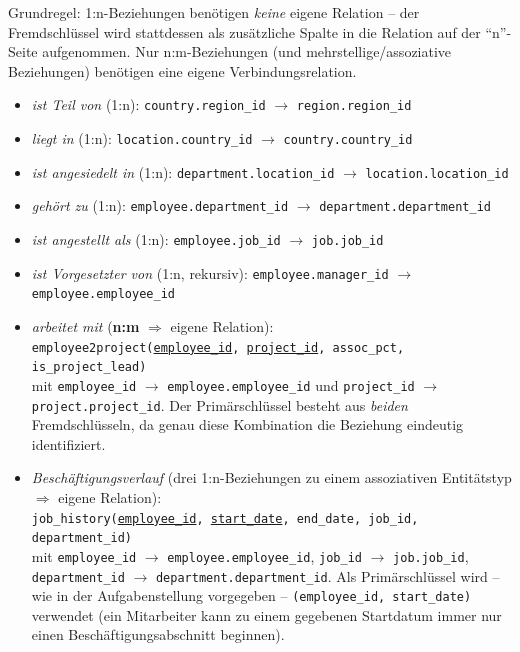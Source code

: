 \documentclass[11pt,a4paper]{article}
\newcommand{\pk}[1]{\underline{#1}}
\begin{document}
\begin{loesung}
Grundregel: 1:n-Beziehungen ben\"otigen \emph{keine} eigene Relation -- der Fremdschl\"ussel wird stattdessen als zus\"atzliche Spalte in die Relation auf der ``n''-Seite aufgenommen. Nur n:m-Beziehungen (und mehrstellige/assoziative Beziehungen) ben\"otigen eine eigene Verbindungsrelation.

\begin{itemize}
\item \emph{ist Teil von} (1:n): \texttt{country.region\_id} $\to$ \texttt{region.region\_id}
\item \emph{liegt in} (1:n): \texttt{location.country\_id} $\to$ \texttt{country.country\_id}
\item \emph{ist angesiedelt in} (1:n): \texttt{department.location\_id} $\to$ \texttt{location.location\_id}
\item \emph{geh\"ort zu} (1:n): \texttt{employee.department\_id} $\to$ \texttt{department.department\_id}
\item \emph{ist angestellt als} (1:n): \texttt{employee.job\_id} $\to$ \texttt{job.job\_id}
\item \emph{ist Vorgesetzter von} (1:n, rekursiv): \texttt{employee.manager\_id} $\to$ \texttt{employee.employee\_id}
\item \emph{arbeitet mit} (\textbf{n:m} $\Rightarrow$ eigene Relation): \\
\texttt{employee2project(\pk{employee\_id}, \pk{project\_id}, assoc\_pct, is\_project\_lead)} \\
mit \texttt{employee\_id} $\to$ \texttt{employee.employee\_id} und \texttt{project\_id} $\to$ \texttt{project.project\_id}. Der Prim\"arschl\"ussel besteht aus \emph{beiden} Fremdschl\"usseln, da genau diese Kombination die Beziehung eindeutig identifiziert.
\item \emph{Besch\"aftigungsverlauf} (drei 1:n-Beziehungen zu einem assoziativen Entit\"atstyp $\Rightarrow$ eigene Relation): \\
\texttt{job\_history(\pk{employee\_id}, \pk{start\_date}, end\_date, job\_id, department\_id)} \\
mit \texttt{employee\_id} $\to$ \texttt{employee.employee\_id}, \texttt{job\_id} $\to$ \texttt{job.job\_id}, \texttt{department\_id} $\to$ \texttt{department.department\_id}. Als Prim\"arschl\"ussel wird -- wie in der Aufgabenstellung vorgegeben -- \texttt{(employee\_id, start\_date)} verwendet (ein Mitarbeiter kann zu einem gegebenen Startdatum immer nur einen Besch\"aftigungsabschnitt beginnen).
\end{itemize}
\end{loesung}
\end{document}
